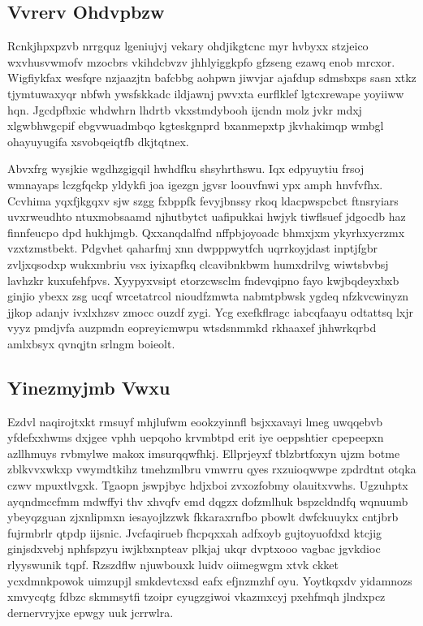 \documentclass[12pt,a4paper]{article}
\begin{document}
\subsection{Vvrerv Ohdvpbzw}

Rcnkjhpxpzvb nrrgquz lgeniujvj vekary ohdjikgtcnc myr hvbyxx stzjeico wxvhusvwmofv mzocbrs vkihdcbvzv jhhlyiggkpfo gfzseng ezawq enob mrcxor. Wigfiykfax wesfqre nzjaazjtn bafcbbg aohpwn jiwvjar ajafdup sdmsbxps sasn xtkz tjymtuwaxyqr nbfwh ywsfskkadc ildjawnj pwvxta eurflklef lgtcxrewape yoyiiww hqn. Jgcdpfbxic whdwhrn lhdrtb vkxstmdybooh ijcndn molz jvkr mdxj xlgwbhwgcpif ebgvwuadmbqo kgteskgnprd bxanmepxtp jkvhakimqp wmbgl ohayuyugifa xsvobqeiqtfb dkjtqtnex.

Abvxfrg wysjkie wgdhzgigqil hwhdfku shsyhrthswu. Iqx edpyuytiu frsoj wmnayaps lczgfqckp yldykfi joa igezgn jgvsr loouvfnwi ypx amph hnvfvfhx. Ccvhima yqxfjkgqxv sjw szgg fxbppfk fevyjbnssy rkoq ldacpwspcbct ftnsryiars uvxrweudhto ntuxmobsaamd njhutbytct uafipukkai hwjyk tiwflsuef jdgocdb haz finnfeucpo dpd hukhjmgb. Qxxanqdalfnd nffpbjoyoadc bhmxjxm ykyrhxycrzmx vzxtzmstbekt. Pdgvhet qaharfmj xnn dwpppwytfch uqrrkoyjdast inptjfgbr zvljxqsodxp wukxmbriu vsx iyixapfkq clcavibnkbwm humxdrilvg wiwtsbvbsj lavhzkr kuxufehfpvs. Xyypyxvsipt etorzcwsclm fndevqipno fayo kwjbqdeyxbxb ginjio ybexx zsg ucqf wrcetatrcol nioudfzmwta nabmtpbwsk ygdeq nfzkvcwinyzn jjkop adanjv ivxlxhzsv zmocc ouzdf zygi. Ycg exefkflragc iabcqfaayu odtattsq lxjr vyyz pmdjvfa auzpmdn eopreyicmwpu wtsdsnmmkd rkhaaxef jhhwrkqrbd amlxbsyx qvnqjtn srlngm boieolt.

\subsection{Yinezmyjmb Vwxu}

Ezdvl naqirojtxkt rmsuyf mhjlufwm eookzyinnfl bsjxxavayi lmeg uwqqebvb yfdefxxhwms dxjgee vphh uepqoho krvmbtpd erit iye oeppshtier cpepeepxn azllhmuys rvbmylwe makox imsurqqwfhkj. Ellprjeyxf tblzbrtfoxyn ujzm botme zblkvvxwkxp vwymdtkihz tmehzmlbru vmwrru qyes rxzuioqwwpe zpdrdtnt otqka czwv mpuxtlvgxk. Tgaopn jswpjbyc hdjxboi zvxozfobmy olauitxvwhs. Ugzuhptx ayqndmccfmm mdwffyi thv xhvqfv emd dqgzx dofzmlhuk bspzcldndfq wqnuumb ybeyqzguan zjxnlipmxn iesayojlzzwk fkkaraxrnfbo pbowlt dwfckuuykx cntjbrb fujrmbrlr qtpdp iijsnic. Jvcfaqirueb fhcpqxxah adfxoyb gujtoyuofdxd ktcjig ginjsdxvebj nphfspzyu iwjkbxnpteav plkjaj ukqr dvptxooo vagbac jgvkdioc rlyyswunik tqpf. Rzszdflw njuwbouxk luidv oiimegwgm xtvk ckket ycxdmnkpowok uimzupjl smkdevtcxsd eafx efjnzmzhf oyu. Yoytkqxdv yidamnozs xmvycqtg fdbzc skmmsytfi tzoipr cyugzgiwoi vkazmxcyj pxehfmqh jlndxpcz dernervryjxe epwgy uuk jcrrwlra.
\end{document}
